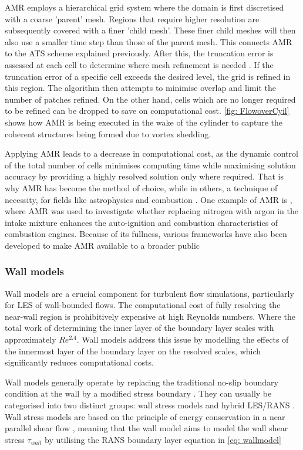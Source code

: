 AMR employs a hierarchical grid system where the domain is first discretised with a coarse 'parent' mesh. Regions that require higher resolution are subsequently covered with a finer 'child mesh'. These finer child meshes will then also use a smaller time step than those of the parent mesh. This connects AMR to the ATS scheme explained previously. After this, the truncation error is assessed at each cell to determine where mesh refinement is needed \cite{Berger1984}. If the truncation error of a specific cell exceeds the desired level, the grid is refined in this region. The algorithm then attempts to minimise overlap and limit the number of patches refined. On the other hand, cells which are no longer required to be refined can be dropped to save on computational cost. \autoref{fig: FlowoverCyil} shows how AMR is being executed in the wake of the cylinder to capture the coherent structures being formed due to vortex shedding. 

Applying AMR leads to a decrease in computational cost, as the dynamic control of the total number of cells minimises computing time while maximising solution accuracy by providing a highly resolved solution only where required. That is why AMR has become the method of choice, while in others, a technique of necessity, for fields like astrophysics and combustion \cite{plewa2005}. One example of AMR is \textcite{Shahsavan2018}, where AMR was used to investigate whether replacing nitrogen with argon in the intake mixture enhances the auto-ignition and combustion characteristics of combustion engines. Because of its fullness, various frameworks have also been developed to make AMR available to a broader public \cite{Dubey2014, MacNeice2000}
 
\subsubsection{Wall models}
Wall models are a crucial component for turbulent flow simulations, particularly for LES of wall-bounded flows. The computational cost of fully resolving the near-wall region is prohibitively expensive at high Reynolds numbers. Where the total work of determining the inner layer of the boundary layer scales with approximately $Re^{2.4}$\cite{LARSSON2016}. Wall models address this issue by modelling the effects of the innermost layer of the boundary layer on the resolved scales, which significantly reduces computational costs. 

Wall models generally operate by replacing the traditional no-slip boundary condition at the wall by a modified stress boundary \cite{Piomelli2008}. They can usually be categorised into two distinct groups: wall stress models and hybrid LES/RANS \cite{LARSSON2016}. Wall stress models are based on the principle of energy conservation in a near parallel shear flow \cite{LARSSON2016}, meaning that the wall model aims to model the wall shear stress $\tau_{wall}$ by utilising the RANS boundary layer equation in \autoref{eq: wallmodel} 

